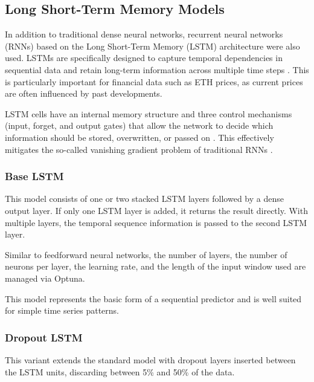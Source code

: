 

\subsection{Long Short-Term Memory Models}
\label{chap:lstm}

In addition to traditional dense neural networks, recurrent neural networks (RNNs) based on the Long Short-Term Memory (LSTM) architecture were also used.
LSTMs are specifically designed to capture temporal dependencies in sequential data and retain long-term information across multiple time steps \cite{lstm-usage}.
This is particularly important for financial data such as ETH prices, as current prices are often influenced by past developments.

LSTM cells have an internal memory structure and three control mechanisms (input, forget, and output gates) that allow the network to decide which information should be stored, overwritten, or passed on \cite{lstm-cell}.
This effectively mitigates the so-called vanishing gradient problem of traditional RNNs \cite{lstm-gradient-problem}.

\subsubsection{Base LSTM}

This model consists of one or two stacked LSTM layers followed by a dense output layer.
If only one LSTM layer is added, it returns the result directly.
With multiple layers, the temporal sequence information is passed to the second LSTM layer.

Similar to feedforward neural networks, the number of layers, the number of neurons per layer, the learning rate, and the length of the input window used are managed via Optuna.

This model represents the basic form of a sequential predictor and is well suited for simple time series patterns.



\subsubsection{Dropout LSTM}

This variant extends the standard model with dropout layers inserted between the LSTM units, discarding between 5\% and 50\% of the data.


